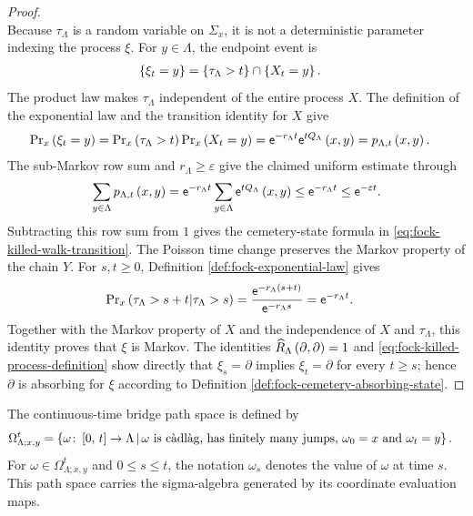 \documentclass[11pt,a4paper]{article}
\theoremstyle{plain}
\theoremstyle{definition}
\theoremstyle{remark}
\begin{document}
\begin{proof}
\begin{equation}
\end{equation}
Because $\tau_{\Lambda}$ is a random variable on $\Sigma_x$, it is not a deterministic parameter indexing the
process $\xi$.
For $y\in\Lambda$, the endpoint event is
$$\begin{aligned}
\left\{ \xi_t=y \right\}
& =
\left\{ \tau_{\Lambda}>t \right\}\cap\left\{ X_t=y \right\}.
\end{aligned}$$
The product law makes $\tau_{\Lambda}$ independent of the entire process $X$.
The definition of the exponential law and the transition identity for $X$ give
$$\begin{aligned}
\mathrm{Pr}_x \left( \xi_t=y \right)
& =
\mathrm{Pr}_x \left( \tau_{\Lambda}>t \right)
\mathrm{Pr}_x \left( X_t=y \right)
=
\mathsf{e}^{-r_{\Lambda}t}
\mathsf{e}^{tQ_{\Lambda}} \left( x,y \right)
=
p_{\Lambda,t} \left( x,y \right).
\end{aligned}$$
The sub-Markov row sum and $r_{\Lambda}\geq\varepsilon$ give the claimed uniform estimate through
$$\begin{aligned}
\sum_{y\in\Lambda}p_{\Lambda,t} \left( x,y \right)
=
\mathsf{e}^{-r_{\Lambda}t}
\sum_{y\in\Lambda}
\mathsf{e}^{tQ_{\Lambda}} \left( x,y \right)
\leq
\mathsf{e}^{-r_{\Lambda}t}
\leq
\mathsf{e}^{-\varepsilon t}.
\end{aligned}$$
Subtracting this row sum from $1$ gives the cemetery-state formula in
\eqref{eq:fock-killed-walk-transition}.
The Poisson time change preserves the Markov property of the chain $Y$.
For $s,t\geq0$, Definition \ref{def:fock-exponential-law} gives
$$\begin{aligned}
\mathrm{Pr}_x \left( \tau_{\Lambda}>s+t \middle| \tau_{\Lambda}>s \right)
& =
\frac{\mathsf{e}^{-r_{\Lambda}\left( s+t \right)}}{\mathsf{e}^{-r_{\Lambda}s}}
=
\mathsf{e}^{-r_{\Lambda}t}.
\end{aligned}$$
Together with the Markov property of $X$ and the independence of $X$ and $\tau_{\Lambda}$, this identity proves
that $\xi$ is Markov.
The identities $\widehat{R}_{\Lambda} \left( \partial,\partial \right)=1$ and
\eqref{eq:fock-killed-process-definition} show directly that $\xi_s=\partial$ implies $\xi_t=\partial$ for
every $t\geq s$; hence $\partial$ is absorbing for $\xi$ according to
Definition \ref{def:fock-cemetery-absorbing-state}.
\end{proof}

The continuous-time bridge path space is defined by \begin{equation}
\begin{aligned}
\Omega_{\Lambda;x,y}^{t}
& =
\left\{\omega\colon\left[ 0,\,t \right]\to\Lambda \, \middle| \, \text{$\omega$ is càdlàg, has finitely many jumps,
$\omega_0=x $ and $\omega_t=y$}\right\}.
\end{aligned}
\label{eq:fock-continuous-bridge-path-space}
\end{equation} For \(\omega\in\Omega_{\Lambda;x,y}^{t}\) and \(0\leq s\leq t\), the notation \(\omega_s\) denotes the value of \(\omega\) at time \(s\). This path space carries the sigma-algebra generated by its coordinate evaluation maps.
\end{document}
